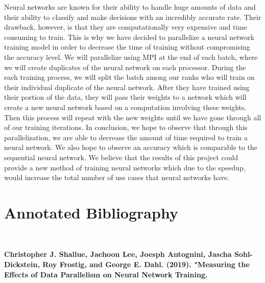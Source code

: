 \documentclass[11pt]{article}
\begin{document}
Neural networks are known for their ability to handle huge amounts of data and their ability to classify and make decisions with an incredibly accurate rate. Their drawback, however, is that they are computationally very expensive and time consuming to train. This is why we have decided to parallelize a neural network training model in order to decrease the time of training without compromising the accuracy level. We will parallelize using MPI at the end of each batch, where we will create duplicates of the neural network on each processor. During the each training process, we will split the batch among our ranks who will train on their individual duplicate of the neural network. After they have trained using their portion of the data, they will pass their weights to a network which will create a new neural network based on a computation involving these weights. Then this process will repeat with the new weights until we have gone through all of our training iterations. In conclusion, we hope to observe that through this parallelization, we are able to decrease the amount of time required to train a neural network. We also hope to observe an accuracy which is comparable to the sequential neural network. We believe that the results of this project could provide a new method of training neural networks which due to the speedup, would increase the total number of use cases that neural networks have.



\newpage 

\onecolumn
\section*{Annotated Bibliography}\label{annon} 

\

\noindent \textbf{ Christopher J. Shallue, Jaehoon Lee, Joesph Antognini, Jascha Sohl-Dickstein, Roy Frostig, and George E. Dahl. (2019). "Measuring the Effects of Data Parallelism on Neural Network Training.}

\
\end{document}
